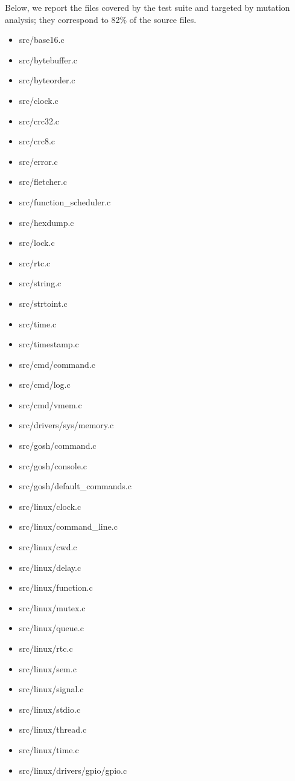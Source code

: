 Below, we report the files covered by the test suite and targeted by mutation analysis; they correspond to 82\% of the source files. 

\begin{itemize}
	\item src/base16.c
	\item src/bytebuffer.c
	\item src/byteorder.c
	\item src/clock.c
	\item src/crc32.c
	\item src/crc8.c
	\item src/error.c
	\item src/fletcher.c
	\item src/function\_scheduler.c
	\item src/hexdump.c
	\item src/lock.c
	\item src/rtc.c
	\item src/string.c
	\item src/strtoint.c
	\item src/time.c
	\item src/timestamp.c
	\item src/cmd/command.c
	\item src/cmd/log.c
	\item src/cmd/vmem.c
	\item src/drivers/sys/memory.c
	\item src/gosh/command.c
	\item src/gosh/console.c
	\item src/gosh/default\_commands.c
	\item src/linux/clock.c
	\item src/linux/command\_line.c
	\item src/linux/cwd.c
	\item src/linux/delay.c
	\item src/linux/function.c
	\item src/linux/mutex.c
	\item src/linux/queue.c
	\item src/linux/rtc.c
	\item src/linux/sem.c
	\item src/linux/signal.c
	\item src/linux/stdio.c
	\item src/linux/thread.c
	\item src/linux/time.c
	\item src/linux/drivers/gpio/gpio.c

\end{itemize}
